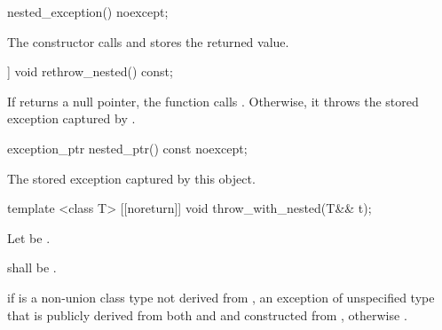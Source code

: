 \begin{itemdecl}
nested_exception() noexcept;
\end{itemdecl}

\begin{itemdescr}
\pnum
\effects The constructor calls  and stores the returned value.
\end{itemdescr}

\begin{itemdecl}
[[noreturn]] void rethrow_nested() const;
\end{itemdecl}

\begin{itemdescr}
\pnum
\effects If  returns a null pointer, the function calls .
Otherwise, it throws the stored exception captured by .
\end{itemdescr}

\begin{itemdecl}
exception_ptr nested_ptr() const noexcept;
\end{itemdecl}

\begin{itemdescr}
\pnum
\returns The stored exception captured by this  object.
\end{itemdescr}

\begin{itemdecl}
template <class T> [[noreturn]] void throw_with_nested(T&& t);
\end{itemdecl}

\begin{itemdescr}
\pnum
Let  be .

\pnum
\requires {} shall be .

\pnum
\throws
if  is a non-union class type not derived from
, an exception of unspecified type that is publicly derived from both
 and 
and constructed from , otherwise
.
\end{itemdescr}

